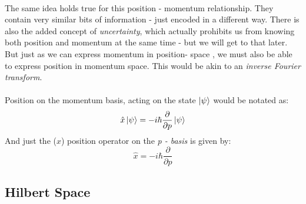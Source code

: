 \documentclass[12pt,letterpaper]{book}
\begin{document}
\paragraph*{}The same idea holds true for this position - momentum relationship. They contain very similar bits of information - just encoded in a different way. There is also the added concept of \textit{uncertainty}, which actually prohibits us from knowing both position and momentum at the same time - but we will get to that later. But just as we can express momentum in position- space , we must also be able to express position in momentum space. This would be akin to an \textit{inverse Fourier transform}.
\paragraph*{}Position on the momentum basis, acting on the state $\ket{\psi}$ would be notated as:
\begin{equation}
\label{position on psi}
\hat{x}\ket{\psi} = -i\hbar\frac{\partial}{\partial p}\ket{\psi}
\end{equation}
And just the ($x$) position operator on the \textit{p - basis} is given by:
\begin{equation}
\label{position}
\hat{x} = -i\hbar\frac{\partial}{\partial p}
\end{equation}


\subsection*{Hilbert Space}
\end{document}
